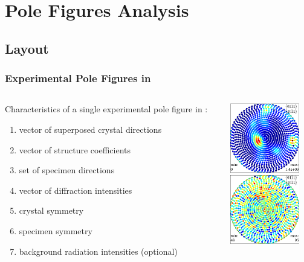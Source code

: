 \section{Pole Figures Analysis}

\subsection*{Layout}

\begin{frame}[fragile]
  \frametitle{Experimental Pole Figures in \MTEX}

  \begin{columns}

    \begin{column}{8.2cm}

      Characteristics of a single experimental pole figure in \mtex:
      \begin{enumerate}
      \item vector of superposed crystal directions
      \item vector of structure coefficients
      \item set of specimen directions
      \item vector of diffraction intensities
      \item crystal symmetry
      \item specimen symmetry
      \item background radiation intensities (optional)
      \end{enumerate}

    \end{column}

    \begin{column}{3cm}
      \includegraphics[width=3cm]{pic/pf1}\\
      \includegraphics[width=3cm]{pic/pfso9_bg}
    \end{column}


  \end{columns}


\end{frame}



